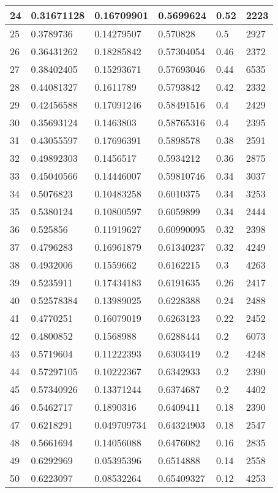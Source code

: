 \begin{longtable}{|l|l|l|l|l|l|}
24 & 0.31671128 & 0.16709901 & 0.5699624 & 0.52 & 2223 \\ \hline 
25 & 0.3789736 & 0.14279507 & 0.570828 & 0.5 & 2927 \\ \hline 
26 & 0.36431262 & 0.18285842 & 0.57304054 & 0.46 & 2372 \\ \hline 
27 & 0.38402405 & 0.15293671 & 0.57693046 & 0.44 & 6535 \\ \hline 
28 & 0.44081327 & 0.1611789 & 0.5793842 & 0.42 & 2332 \\ \hline 
29 & 0.42456588 & 0.17091246 & 0.58491516 & 0.4 & 2429 \\ \hline 
30 & 0.35693124 & 0.1463803 & 0.58765316 & 0.4 & 2395 \\ \hline 
31 & 0.43055597 & 0.17696391 & 0.5898578 & 0.38 & 2591 \\ \hline 
32 & 0.49892303 & 0.1456517 & 0.5934212 & 0.36 & 2875 \\ \hline 
33 & 0.45040566 & 0.14446007 & 0.59810746 & 0.34 & 3037 \\ \hline 
34 & 0.5076823 & 0.10483258 & 0.6010375 & 0.34 & 3253 \\ \hline 
35 & 0.5380124 & 0.10800597 & 0.6059899 & 0.34 & 2444 \\ \hline 
36 & 0.525856 & 0.11919627 & 0.60990095 & 0.32 & 2398 \\ \hline 
37 & 0.4796283 & 0.16961879 & 0.61340237 & 0.32 & 4249 \\ \hline 
38 & 0.4932006 & 0.1559662 & 0.6162215 & 0.3 & 4263 \\ \hline 
39 & 0.5235911 & 0.17434183 & 0.6191635 & 0.26 & 2417 \\ \hline 
40 & 0.52578384 & 0.13989025 & 0.6228388 & 0.24 & 2488 \\ \hline 
41 & 0.4770251 & 0.16079019 & 0.6263123 & 0.22 & 2452 \\ \hline 
42 & 0.4800852 & 0.1568988 & 0.6288444 & 0.2 & 6073 \\ \hline 
43 & 0.5719604 & 0.11222393 & 0.6303419 & 0.2 & 4248 \\ \hline 
44 & 0.57297105 & 0.10222367 & 0.6342933 & 0.2 & 2390 \\ \hline 
45 & 0.57340926 & 0.13371244 & 0.6374687 & 0.2 & 4402 \\ \hline 
46 & 0.5462717 & 0.1890316 & 0.6409411 & 0.18 & 2390 \\ \hline 
47 & 0.6218291 & 0.049709734 & 0.64324903 & 0.18 & 2547 \\ \hline 
48 & 0.5661694 & 0.14056088 & 0.6476082 & 0.16 & 2835 \\ \hline 
49 & 0.6292969 & 0.05395396 & 0.6514888 & 0.14 & 2558 \\ \hline 
50 & 0.6223097 & 0.08532264 & 0.65409327 & 0.12 & 4253 \\ \hline 
\end{longtable}